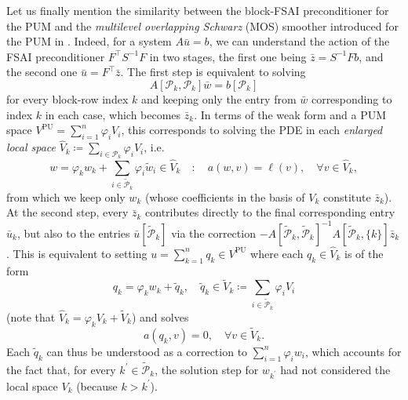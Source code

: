 \documentclass[a4paper]{article}
\theoremstyle{plain}
\theoremstyle{definition}
\theoremstyle{remark}
\begin{document}
Let us finally mention the similarity between the block-FSAI preconditioner for the PUM and the \emph{multilevel overlapping Schwarz} (MOS) smoother introduced for the PUM in \cite{Griebel2005}. Indeed, for a system \(A \bar{u} = b\), we can understand the action of the FSAI preconditioner \(F^{\top} S^{-1} F\) in two stages, the first one being \(\bar{z} = S^{-1} F b\), and the second one \(\bar{u} = F^{\top} \bar{z}\). The first step is equivalent to solving
\begin{equation*}
	A[\mathcal{P}_k, \mathcal{P}_k] \bar{w} = b[\mathcal{P}_k]
\end{equation*}
for every block-row index \(k\) and keeping only the entry from \(\bar{w}\) corresponding to index \(k\) in each case, which becomes \(\bar{z}_k\). In terms of the weak form and a PUM space \(V^{\mathrm{PU}} = \sum_{i=1}^n \varphi_i V_i\), this corresponds to solving the PDE in each \emph{enlarged local space} \(\hat{V}_k \coloneqq \sum_{i \in \mathcal{P}_k} \varphi_i V_i\), i.e.
\begin{equation*}
	w = \varphi_k w_k + \sum_{i \in \tilde{\mathcal{P}}_k} \varphi_i \tilde{w}_i \in \hat{V}_k \quad \colon \quad a(w, v) = \ell(v), \quad \forall v\in \hat{V}_k,
\end{equation*}
from which we keep only \(w_k\) (whose coefficients in the basis of \(V_k\) constitute \(\bar{z}_k\)). At the second step, every \(\bar{z}_k\) contributes directly to the final corresponding entry \(\bar{u}_k\), but also to the entries \(\bar{u}[\tilde{\mathcal{P}}_k]\) via the correction \(- A[\tilde{\mathcal{P}}_k, \tilde{\mathcal{P}}_k]^{-1} A[\tilde{\mathcal{P}}_k, \{k\}] \bar{z}_k\). This is equivalent to setting \(u = \sum_{k=1}^n q_k \in V^{\mathrm{PU}}\) where each \(q_k \in \hat{V}_k\) is of the form
\begin{equation*}
	q_k = \varphi_k w_k + \tilde{q}_k, \quad \tilde{q}_k \in \tilde{V}_k \coloneqq \sum_{i \in \tilde{\mathcal{P}}_k} \varphi_i V_i
\end{equation*}
(note that \(\hat{V}_k = \varphi_k V_k + \tilde{V}_k\)) and solves
\begin{equation*}
	a(q_k, v) = 0, \quad \forall v \in \tilde{V}_k.
\end{equation*}
Each \(\tilde{q}_k\) can thus be understood as a correction to \(\sum_{i=1}^n \varphi_i w_i\), which accounts for the fact that, for every \(k^{\prime} \in \tilde{\mathcal{P}}_k\), the solution step for \(w_{k^{\prime}}\) had not considered the local space \(V_k\) (because \(k > k^{\prime}\)).
\end{document}
